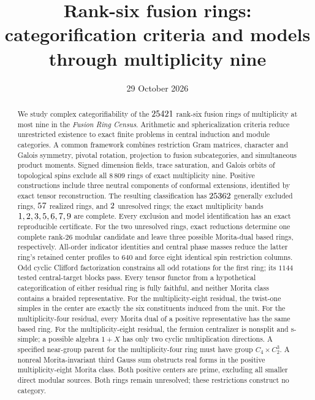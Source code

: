 \documentclass[11pt]{article}
\title{Rank-six fusion rings:\\categorification criteria and models\\through multiplicity nine}
\author{}
\date{29 October 2026}
\begin{document}
\maketitle
\begin{abstract}
We study complex categorifiability of the $25421$ rank-six fusion
rings of multiplicity at most nine in the \emph{Fusion Ring Census}.
Arithmetic and sphericalization criteria reduce unrestricted existence to
exact finite problems in central induction and module categories.
A common framework combines restriction Gram matrices, character and
Galois symmetry, pivotal rotation, projection to fusion subcategories,
and simultaneous product moments. Signed dimension fields, trace saturation,
and Galois orbits of topological spins exclude all $8\,809$ rings of exact
multiplicity nine. Positive constructions include three
neutral components of conformal extensions, identified by exact tensor
reconstruction.
The resulting classification has $25362$ generally excluded
rings, $57$ realized rings, and $2$ unresolved
rings; the exact multiplicity bands $1, 2, 3, 5, 6, 7, 9$ are complete.
Every exclusion and model identification has an exact reproducible
certificate. For the two unresolved rings, exact reductions determine
one complete rank-26 modular candidate and leave three possible
Morita-dual based rings, respectively. All-order indicator identities and central phase masses reduce the latter
ring's retained center profiles to $640$ and force eight identical spin
restriction columns. Odd cyclic Clifford factorization constrains all odd
rotations for the first ring; its $1144$ tested central-target blocks pass. Every tensor functor from a hypothetical
categorification of either residual ring is fully faithful, and neither
Morita class contains a braided representative. For the multiplicity-eight
residual, the twist-one simples in the center are exactly the six
constituents induced from the unit. For the multiplicity-four residual, every Morita dual of a positive representative has the same based ring. For the multiplicity-eight residual, the fermion centralizer is nonsplit and s-simple; a possible algebra $1+X$ has only two cyclic multiplication directions. A specified near-group parent for the multiplicity-four ring must have group $C_4\times C_2^3$. A nonreal Morita-invariant third Gauss sum obstructs real forms in the positive multiplicity-eight Morita class. Both positive centers are prime, excluding all smaller direct modular sources. Both rings remain unresolved; these restrictions construct no category.
\end{abstract}
\end{document}
